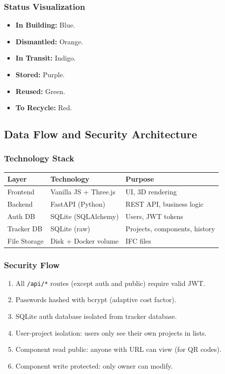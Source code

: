 \documentclass[11pt,a4paper]{article}
\begin{document}
\subsubsection{Status Visualization}

\begin{itemize}
    \item \textbf{In Building:} Blue.
    \item \textbf{Dismantled:} Orange.
    \item \textbf{In Transit:} Indigo.
    \item \textbf{Stored:} Purple.
    \item \textbf{Reused:} Green.
    \item \textbf{To Recycle:} Red.
\end{itemize}

\subsection{Data Flow and Security Architecture}

\subsubsection{Technology Stack}

\begin{center}
\begin{tabular}{|l|l|l|}
\hline
\textbf{Layer} & \textbf{Technology} & \textbf{Purpose} \\
\hline
Frontend & Vanilla JS + Three.js & UI, 3D rendering \\
Backend & FastAPI (Python) & REST API, business logic \\
Auth DB & SQLite (SQLAlchemy) & Users, JWT tokens \\
Tracker DB & SQLite (raw) & Projects, components, history \\
File Storage & Disk + Docker volume & IFC files \\
\hline
\end{tabular}
\end{center}

\subsubsection{Security Flow}

\begin{enumerate}
    \item All \texttt{/api/*} routes (except auth and public) require valid JWT.
    \item Passwords hashed with bcrypt (adaptive cost factor).
    \item SQLite auth database isolated from tracker database.
    \item User-project isolation: users only see their own projects in lists.
    \item Component read public: anyone with URL can view (for QR codes).
    \item Component write protected: only owner can modify.
\end{enumerate}
\end{document}
